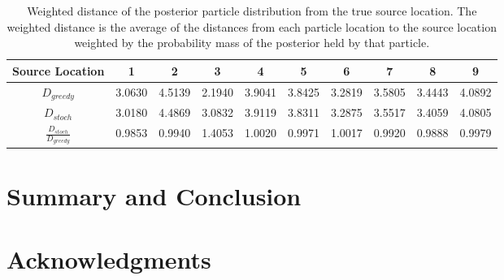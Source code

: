 \documentclass[submit, 12pt]{aiaa-pretty-modified}
\begin{document}
\begin{table}[htb]
\begin{center}
\begin{tabular}{|c||c||c||c||c||c||c||c||c||c|}
\hline
 Source Location & 1 & 2 & 3 & 4 & 5 & 6 & 7 & 8 & 9 \\
\hline \hline
$D_{greedy}$ & 3.0630 & 4.5139 & 2.1940 & 3.9041 & 3.8425 & 3.2819 & 3.5805 & 3.4443 & 4.0892 \\
\hline
$D_{stoch}$ & 3.0180 & 4.4869 & 3.0832 & 3.9119 & 3.8311 & 3.2875 & 3.5517 & 3.4059 & 4.0805 \\
\hline
$\frac{D_{stoch}}{D_{greedy}}$ & 0.9853 & 0.9940 & 1.4053 & 1.0020 & 0.9971 & 1.0017 & 0.9920 & 0.9888 & 0.9979 \\
\hline
\end{tabular}
\caption[Probabilistically weighted distance from the posterior estimate to the
source location]{Weighted distance of the posterior particle distribution from the true
  source location. The weighted distance is the average of the distances from
  each particle location to the source location weighted by the probability
  mass of the posterior held by that particle.}
\label{tab:weighted-distance}
\end{center}
\end{table}

\section{Summary and Conclusion}

\section{Acknowledgments}

\newpage


\nocite{*}
\end{document}
